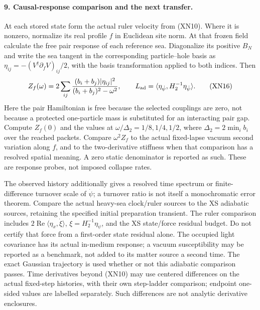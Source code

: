 \documentclass[11pt]{article}
\begin{document}
\paragraph{9. Causal-response comparison and the next transfer.}
At each stored state form the actual ruler velocity from (XN10).
Where it is nonzero, normalize its real profile $f$ in Euclidean
site norm.  At that frozen field calculate the free pair response
of each reference sea.  Diagonalize its positive $B_N$ and write
the sea tangent in the corresponding particle--hole basis as
$\eta_{ij}=-(V^\dagger\partial_fV)_{ij}/2$, with the basis
transformation applied to both indices.  Then
\begin{equation}
 Z_f(\omega)=2\sum_{ij}
   \frac{(b_i+b_j)|\eta_{ij}|^2}
        {(b_i+b_j)^2-\omega^2},\qquad
 L_{\rm ad}=\langle\eta_{\dot\psi},H_2^{-1}
                                      \eta_{\dot\psi}\rangle .
 \tag{XN16}
\end{equation}
Here the pair Hamiltonian is free because the selected couplings
are zero, not because a protected one-particle mass is substituted
for an interacting pair gap.  Compute $Z_f(0)$ and the values at
$\omega/\Delta_2=1/8,1/4,1/2$, where $\Delta_2=2\min_i b_i$ over
the reached packets.  Compare $\omega^2Z_f$ to the actual
fixed-lapse vacuum second variation along $f$, and to the
two-derivative stiffness when that comparison has a resolved
spatial meaning.  A zero static denominator is reported as such.
These are response probes, not imposed collapse rates.

The observed history additionally gives a resolved time spectrum
or finite-difference turnover scale of $\dot\psi$; a turnover
ratio is not itself a monochromatic error theorem.  Compare the
actual heavy-sea clock/ruler sources to the XS adiabatic sources,
retaining the specified initial preparation transient.  The
ruler comparison includes
$2\operatorname{Re}\langle\eta_x,\dot\xi\rangle$,
$\xi=H_2^{-1}\eta_{\dot\psi}$, and the XS state/force residual
budget.  Do not certify that force from a first-order state
residual alone.  The occupied light covariance has its actual
in-medium response; a vacuum susceptibility may be reported as
a benchmark, not added to its matter source a second time.
The exact Gaussian trajectory is used whether or not this
adiabatic comparison passes.
Time derivatives beyond (XN10) may use centered differences on
the actual fixed-step histories, with their own step-ladder
comparison; endpoint one-sided values are labelled separately.
Such differences are not analytic derivative enclosures.
\end{document}
